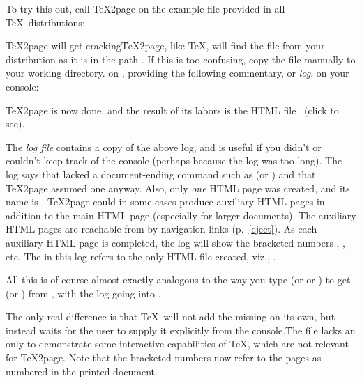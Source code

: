 
To try this out, call \TeX2page on the example file
provided in all \TeX\ distributions:


\n
{}
%
\TeX2page will get cracking\f{\TeX2page, like \TeX, will find the
file from your distribution as it is in the path .
If this is too confusing, copy the file manually to your working
directory.} on , providing
the following commentary, or {\em log}, on your console:

\medbreak

\medbreak

\n \TeX2page is now done, and the result of its labors
is the HTML file
\ifx\shipout\UnDeFiNeD\ (click
to see)\fi.


The {\em log file} 
contains a copy of the above log, and is useful
if you didn’t or couldn’t keep track of the console
(perhaps because the log was too long).
The log says that  lacked a
document-ending command such as \p{\end} (or \p{\bye})
and that \TeX2page assumed one anyway.  Also, only
{\em one} HTML page was created, and its name is
.  \TeX2page could in some cases produce
auxiliary HTML pages in addition to
the main HTML page  (especially
for larger documents).  The auxiliary HTML pages
are reachable from 
by navigation links (p.~\ref{eject}).  As  each
auxiliary HTML page is completed, the log will show the
bracketed numbers \p{[1]}, \p{[2]}, etc.  The \p{[0]}
in this log refers to the only HTML file created, viz.,
.

All this is of course almost exactly analogous to the
way you type  (or  or ) to get
 (or )
from , with the log going into
.

\medbreak

\medbreak

\n The only real difference is
that \TeX\ will not add the missing \p{\end} on its
own, but instead waits for the user to supply it
explicitly from the console.\f{The file 
lacks an \p{\end} only to demonstrate some interactive
capabilities of \TeX, which are not relevant for
\TeX2page.}  Note that the bracketed numbers now refer
to the pages as numbered in the printed document.

